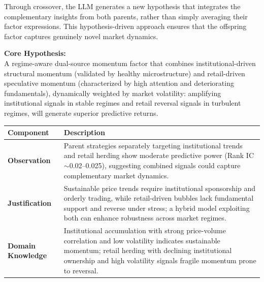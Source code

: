 Through crossover, the LLM generates a new hypothesis that integrates the complementary insights from both parents, rather than simply averaging their factor expressions. This hypothesis-driven approach ensures that the offspring factor captures genuinely novel market dynamics.

\begin{tcolorbox}[
  colback=lightblue,
  colframe=darkblue,
  fonttitle=\bfseries,
  title={\faLightbulb\ Hypothesis},
  arc=2mm,
  boxrule=0.5pt,
  breakable
]

\textbf{Core Hypothesis:}\\
A regime-aware dual-source momentum factor that combines institutional-driven structural momentum (validated by healthy microstructure) and retail-driven speculative momentum (characterized by high attention and deteriorating fundamentals), dynamically weighted by market volatility: amplifying institutional signals in stable regimes and retail reversal signals in turbulent regimes, will generate superior predictive returns.

\vspace{0.3cm}

\begin{tabular}{@{}p{}p{}@{}}
\toprule
\textbf{Component} & \textbf{Description} \\
\midrule
\textbf{Observation} & Parent strategies separately targeting institutional trends and retail herding show moderate predictive power (Rank IC $\sim$0.02--0.025), suggesting combined signals could capture complementary market dynamics. \\
\midrule
\textbf{Justification} & Sustainable price trends require institutional sponsorship and orderly trading, while retail-driven bubbles lack fundamental support and reverse under stress; a hybrid model exploiting both can enhance robustness across market regimes. \\
\midrule
\textbf{Domain Knowledge} & Institutional accumulation with strong price-volume correlation and low volatility indicates sustainable momentum; retail herding with declining institutional ownership and high volatility signals fragile momentum prone to reversal. \\
\bottomrule
\end{tabular}

\end{tcolorbox}

